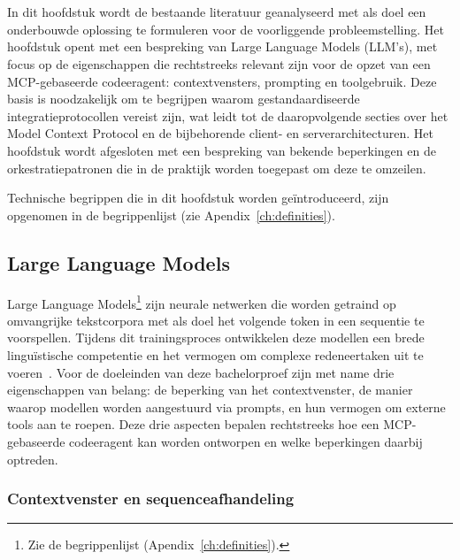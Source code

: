 
\chapter{}\label{ch:stand-van-zaken}

In dit hoofdstuk wordt de bestaande literatuur geanalyseerd met als doel een onderbouwde oplossing te formuleren voor de voorliggende probleemstelling. Het hoofdstuk opent met een bespreking van Large Language Models (LLM's), met focus op de eigenschappen die rechtstreeks relevant zijn voor de opzet van een MCP-gebaseerde codeeragent: contextvensters, prompting en toolgebruik. Deze basis is noodzakelijk om te begrijpen waarom gestandaardiseerde integratieprotocollen vereist zijn, wat leidt tot de daaropvolgende secties over het Model Context Protocol en de bijbehorende client- en serverarchitecturen. Het hoofdstuk wordt afgesloten met een bespreking van bekende beperkingen en de orkestratiepatronen die in de praktijk worden toegepast om deze te omzeilen.

Technische begrippen die in dit hoofdstuk worden geïntroduceerd, zijn opgenomen in de begrippenlijst (zie Apendix~\ref{ch:definities}).

\section{Large Language Models}\label{sec:llm}

Large Language Models\footnote{Zie de begrippenlijst (Apendix~\ref{ch:definities}).} zijn neurale netwerken die worden getraind op omvangrijke tekstcorpora met als doel het volgende token in een sequentie te voorspellen. Tijdens dit trainingsproces ontwikkelen deze modellen een brede linguïstische competentie en het vermogen om complexe redeneertaken uit te voeren~\cite{brown2020gpt3}. Voor de doeleinden van deze bachelorproef zijn met name drie eigenschappen van belang: de beperking van het contextvenster, de manier waarop modellen worden aangestuurd via prompts, en hun vermogen om externe tools aan te roepen. Deze drie aspecten bepalen rechtstreeks hoe een MCP-gebaseerde codeeragent kan worden ontworpen en welke beperkingen daarbij optreden.

\subsection{Contextvenster en sequenceafhandeling}\label{subsec:context}

